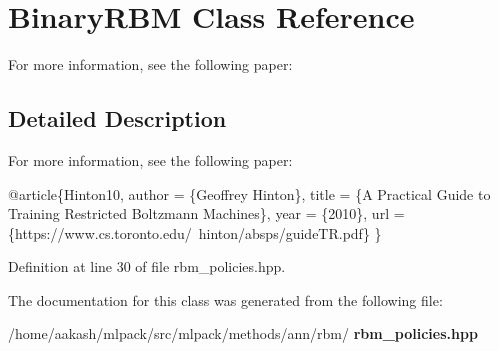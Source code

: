 \section{Binary\+R\+BM Class Reference}
\label{classmlpack_1_1ann_1_1BinaryRBM}


For more information, see the following paper\+:  




\subsection{Detailed Description}
For more information, see the following paper\+: 


\begin{DoxyCode}
@article\{Hinton10,
  author    = \{Geoffrey Hinton\},
  title     = \{A Practical Guide to Training Restricted Boltzmann Machines\},
  year      = \{2010\},
  url       = \{https:\textcolor{comment}{//www.cs.toronto.edu/~hinton/absps/guideTR.pdf\}}
\}
\end{DoxyCode}
 

Definition at line 30 of file rbm\+\_\+policies.\+hpp.



The documentation for this class was generated from the following file\+:\begin{DoxyCompactItemize}
\item 
/home/aakash/mlpack/src/mlpack/methods/ann/rbm/\textbf{ rbm\+\_\+policies.\+hpp}\end{DoxyCompactItemize}
